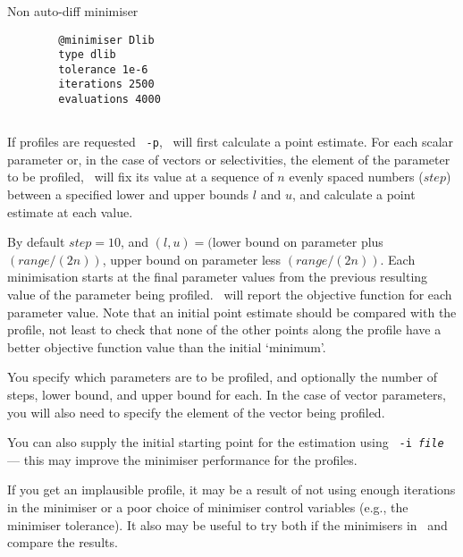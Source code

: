 \subsubsection{}
Non auto-diff minimiser
{\small{\begin{verbatim}
		@minimiser Dlib
		type dlib
		tolerance 1e-6
		iterations 2500
		evaluations 4000
		\end{verbatim}}}

\subsection{\label{sec:estimate-profiles}}
If profiles are requested \texttt{\cname\ -p}, \CNAME\ will first calculate a point estimate. For each scalar parameter or, in the case of vectors or selectivities, the element of the parameter to be profiled, \CNAME\ will fix its value at a sequence of $n$ evenly spaced numbers ($step$) between a specified lower and upper bounds $l$ and $u$, and calculate a point estimate at each value. 

By default $step=10$, and $(l, u)=($lower bound on parameter plus $(range/(2n))$, upper bound on parameter less $(range/(2n))$. Each minimisation starts at the final parameter values from the previous resulting value of the parameter being profiled. \CNAME\ will report the objective function for each parameter value. Note that an initial point estimate should be compared with the profile, not least to check that none of the other points along the profile have a better objective function value than the initial `minimum'.

You specify which parameters are to be profiled, and optionally the number of steps, lower bound, and upper bound for each. In the case of vector parameters, you will also need to specify the element of the vector being profiled. 

You can also supply the initial starting point for the estimation using \texttt{\cname\ -i \emph{file}} --- this may improve the minimiser performance for the profiles.

If you get an implausible profile, it may be a result of not using enough iterations in the minimiser or a poor choice of minimiser control variables (e.g., the minimiser tolerance). It also may be useful to try both if the minimisers in \CNAME\ and compare the results.

\subsection{\label{sec:estimate-MCMC}}

